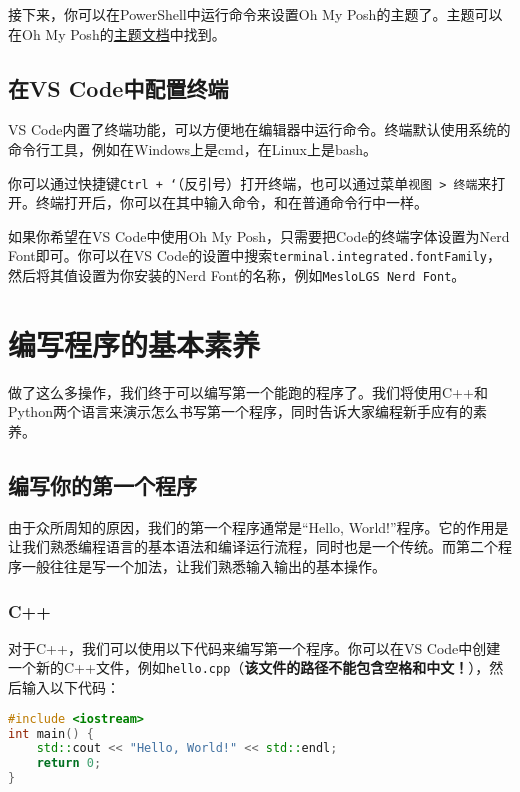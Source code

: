 \documentclass[../main.tex]{subfiles}
\begin{document}
接下来，你可以在PowerShell中运行命令来设置Oh My Posh的主题了。主题可以在Oh My Posh的\href{https://ohmyposh.dev/docs/themes}{主题文档}中找到。 

\subsection{在VS Code中配置终端}

VS Code内置了终端功能，可以方便地在编辑器中运行命令。终端默认使用系统的命令行工具，例如在Windows上是cmd，在Linux上是bash。

你可以通过快捷键\texttt{Ctrl + `}（反引号）打开终端，也可以通过菜单\texttt{视图 > 终端}来打开。终端打开后，你可以在其中输入命令，和在普通命令行中一样。

如果你希望在VS Code中使用Oh My Posh，只需要把Code的终端字体设置为Nerd Font即可。你可以在VS Code的设置中搜索\texttt{terminal.integrated.fontFamily}，然后将其值设置为你安装的Nerd Font的名称，例如\texttt{MesloLGS Nerd Font}。

\section{编写程序的基本素养}

做了这么多操作，我们终于可以编写第一个能跑的程序了。我们将使用C++和Python两个语言来演示怎么书写第一个程序，同时告诉大家编程新手应有的素养。

\subsection{编写你的第一个程序}

由于众所周知的原因，我们的第一个程序通常是“Hello, World!”程序。它的作用是让我们熟悉编程语言的基本语法和编译运行流程，同时也是一个传统。而第二个程序一般往往是写一个加法，让我们熟悉输入输出的基本操作。

\subsubsection{C++}



对于C++，我们可以使用以下代码来编写第一个程序。你可以在VS Code中创建一个新的C++文件，例如\texttt{hello.cpp}（\textbf{该文件的路径不能包含空格和中文！}），然后输入以下代码：

\begin{lstlisting}[language=C++]
#include <iostream>
int main() {
    std::cout << "Hello, World!" << std::endl;
    return 0;
}
\end{lstlisting}
\end{document}
